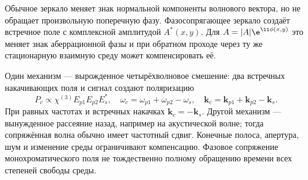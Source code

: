 
Обычное зеркало меняет знак нормальной компоненты волнового вектора, но не обращает произвольную поперечную фазу. Фазосопрягающее зеркало создаёт встречное поле с комплексной амплитудой $A^*(x,y)$. Для $A=|A|\e^{\ii\phi(x,y)}$ это меняет знак аберрационной фазы и при обратном проходе через ту же стационарную взаимную среду может компенсировать её.

Один механизм — вырожденное четырёхволновое смешение: два встречных накачивающих поля и сигнал создают поляризацию
\begin{equation}
 P_c\propto\chi^{(3)}E_{p1}E_{p2}E_s^*,\quad
 \omega_c=\omega_{p1}+\omega_{p2}-\omega_s,\quad
 \bm k_c=\bm k_{p1}+\bm k_{p2}-\bm k_s.
\end{equation}
При равных частотах и встречных накачках $\bm k_c=-\bm k_s$. Другой механизм — вынужденное рассеяние назад, например на акустической волне; тогда сопряжённая волна обычно имеет частотный сдвиг. Конечные полоса, апертура, шум и изменение среды ограничивают компенсацию. Фазовое сопряжение монохроматического поля не тождественно полному обращению времени всех степеней свободы среды.
